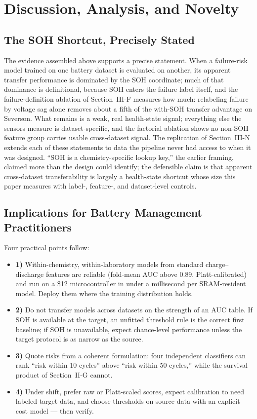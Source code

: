\section{Discussion, Analysis, and Novelty}

\subsection{The SOH Shortcut, Precisely Stated}
The evidence assembled above supports a precise statement. When a failure-risk model trained on one battery dataset is evaluated on another, its apparent transfer performance is dominated by the SOH coordinate; much of that dominance is definitional, because SOH enters the failure label itself, and the failure-definition ablation of Section~III-F measures how much: relabeling failure by voltage sag alone removes about a fifth of the with-SOH transfer advantage on Severson. What remains is a weak, real health-state signal; everything else the sensors measure is dataset-specific, and the factorial ablation shows no non-SOH feature group carries usable cross-dataset signal. The replication of Section~III-N extends each of these statements to data the pipeline never had access to when it was designed. ``SOH is a chemistry-specific lookup key,'' the earlier framing, claimed more than the design could identify; the defensible claim is that apparent cross-dataset transferability is largely a health-state shortcut whose size this paper measures with label-, feature-, and dataset-level controls.

\subsection{Implications for Battery Management Practitioners}
Four practical points follow:
\begin{itemize}
\item \textbf{1)} Within-chemistry, within-laboratory models from standard charge--discharge features are reliable (fold-mean AUC above 0.89, Platt-calibrated) and run on a \$12 microcontroller in under a millisecond per SRAM-resident model. Deploy them where the training distribution holds.
\item \textbf{2)} Do not transfer models across datasets on the strength of an AUC table. If SOH is available at the target, an unfitted threshold rule is the correct first baseline; if SOH is unavailable, expect chance-level performance unless the target protocol is as narrow as the source.
\item \textbf{3)} Quote risks from a coherent formulation: four independent classifiers can rank ``risk within 10 cycles'' above ``risk within 50 cycles,'' while the survival product of Section~II-G cannot.
\item \textbf{4)} Under shift, prefer raw or Platt-scaled scores, expect calibration to need labeled target data, and choose thresholds on source data with an explicit cost model --- then verify.
\end{itemize}

